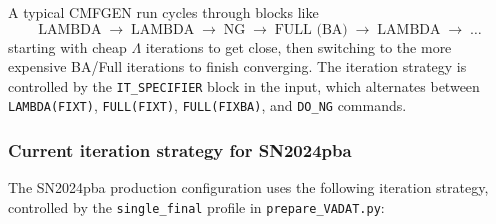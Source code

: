 \documentclass[11pt]{article}
\begin{document}
A typical CMFGEN run cycles through blocks like
\[
  \text{LAMBDA} \;\to\; \text{LAMBDA} \;\to\; \text{NG}
  \;\to\; \text{FULL (BA)} \;\to\; \text{LAMBDA} \;\to\; \dots
\]
starting with cheap $\Lambda$ iterations to get close, then switching to
the more expensive BA/Full iterations to finish converging.  The
iteration strategy is controlled by the \texttt{IT\_SPECIFIER} block in
the input, which alternates between
\texttt{LAMBDA(FIXT)}, \texttt{FULL(FIXT)}, \texttt{FULL(FIXBA)}, and
\texttt{DO\_NG} commands.

\subsubsection{Current iteration strategy for SN2024pba}
\label{sec:iteration-strategy}

The SN2024pba production configuration uses the following iteration
strategy, controlled by the \texttt{single\_final} profile in
\texttt{prepare\_VADAT.py}:
\end{document}
